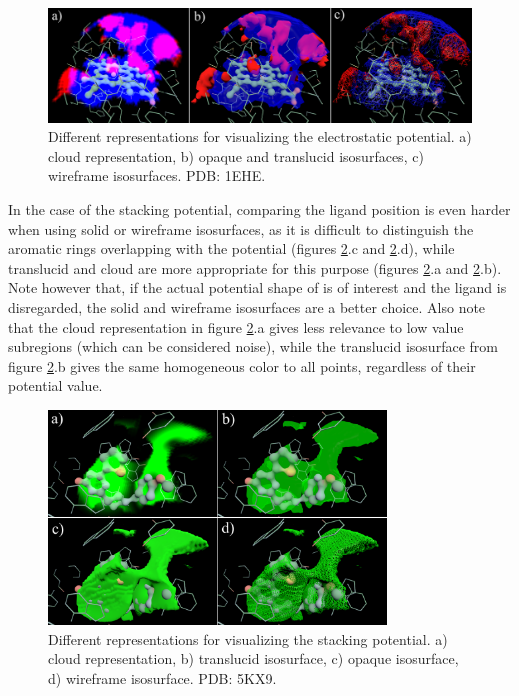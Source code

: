     \begin{figure}[H]
      \centering
      \includegraphics[width=1\textwidth]{figures/results/reprs_0.png}
      \caption{\label{fig:results/reprs_0} Different representations for visualizing the electrostatic potential. a) cloud representation, b) opaque and translucid isosurfaces, c) wireframe isosurfaces. PDB: 1EHE.}
    \end{figure}

    In the case of the stacking potential, comparing the ligand position is even harder when using solid or wireframe isosurfaces, as it is difficult to distinguish the aromatic rings overlapping with the potential (figures \ref{fig:results/reprs_1}.c and \ref{fig:results/reprs_1}.d), while translucid and cloud are more appropriate for this purpose (figures \ref{fig:results/reprs_1}.a and \ref{fig:results/reprs_1}.b). Note however that, if the actual potential shape of is of interest and the ligand is disregarded, the solid and wireframe isosurfaces are a better choice. Also note that the cloud representation in figure \ref{fig:results/reprs_1}.a gives less relevance to low value subregions (which can be considered noise), while the translucid isosurface from figure \ref{fig:results/reprs_1}.b gives the same homogeneous color to all points, regardless of their potential value.

    \begin{figure}[H]
      \centering
      \includegraphics[width=0.8\textwidth]{figures/results/reprs_1.png}
      \caption{\label{fig:results/reprs_1} Different representations for visualizing the stacking potential. a) cloud representation, b) translucid isosurface, c) opaque isosurface, d) wireframe isosurface. PDB: 5KX9.}
    \end{figure}


